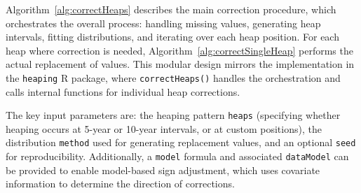 \documentclass[12pt]{article}
\theoremstyle{plain}
\theoremstyle{definition}
\begin{document}
Algorithm~\ref{alg:correctHeaps} describes the main correction procedure, which orchestrates the overall process: handling missing values, generating heap intervals, fitting distributions, and iterating over each heap position. For each heap where correction is needed, Algorithm~\ref{alg:correctSingleHeap} performs the actual replacement of values. This modular design mirrors the implementation in the \texttt{heaping} R package, where \texttt{correctHeaps()} handles the orchestration and calls internal functions for individual heap corrections.

The key input parameters are: the heaping pattern \texttt{heaps} (specifying whether heaping occurs at 5-year or 10-year intervals, or at custom positions), the distribution \texttt{method} used for generating replacement values, and an optional \texttt{seed} for reproducibility. Additionally, a \texttt{model} formula and associated \texttt{dataModel} can be provided to enable model-based sign adjustment, which uses covariate information to determine the direction of corrections.

\small
\end{document}
